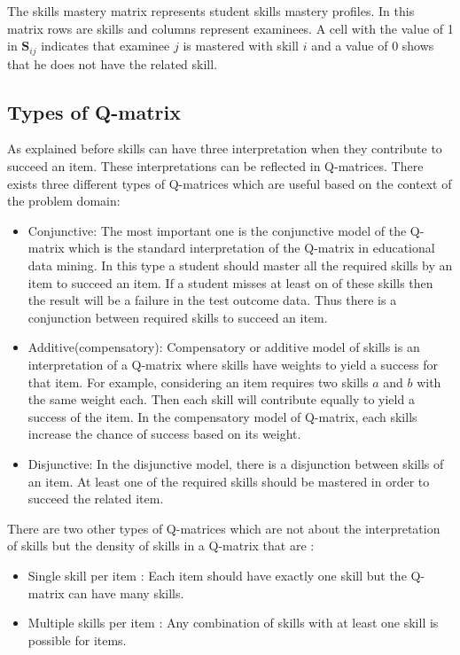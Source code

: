 The skills mastery matrix represents student skills mastery profiles. In this matrix rows are skills and columns represent examinees. A cell with the value of 1 in $\mathbf{S}_{ij}$ indicates that examinee $j$ is mastered with skill $i$ and a value of 0 shows that he does not have the related skill.

\subsection{Types of Q-matrix}
 

As explained before skills can have three interpretation when they contribute to succeed an item. These interpretations can be reflected in Q-matrices. There exists three different types of Q-matrices which are useful based on the context of the problem domain:

\begin{itemize}
\item Conjunctive: The most important one is the conjunctive model of the Q-matrix which is the standard interpretation of the Q-matrix in educational data mining. In this type a student should master all the required skills by an item to succeed an item. If a student misses at least on of these skills then the result will be a failure in the test outcome data. Thus there is a conjunction between required skills to succeed an item.

\item Additive(compensatory): Compensatory or additive model of skills is an interpretation of a Q-matrix where skills have weights to yield a success for that item. For example, considering an item requires two skills $a$ and $b$ with the same weight each. Then each skill will contribute equally to yield a success of the item. In the compensatory model of Q-matrix, each skills increase the chance of success based on its weight.

\item Disjunctive: In the disjunctive model, there is a disjunction between skills of an item. At least one of the required skills should be mastered in order to succeed the related item.
\end{itemize}

There are two other types of Q-matrices which are not about the interpretation of skills but the density of skills in a Q-matrix that are : 
\begin{itemize}
\item Single skill per item : Each item should have exactly one skill but the Q-matrix can have many skills.
\item Multiple skills per item : Any combination of skills with at least one skill is possible for items.
\end{itemize}

